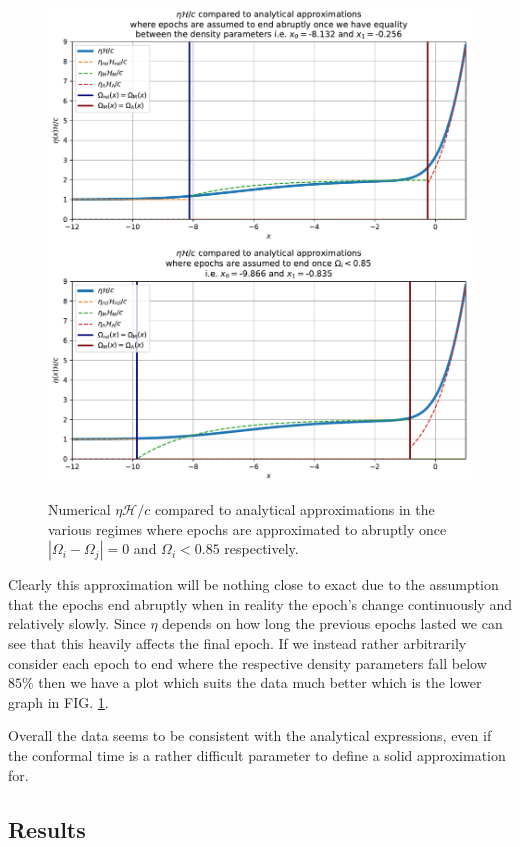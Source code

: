 \documentclass[%
reprint,
 amsmath,amssymb,
 aps,
]{revtex4-2}
\newcommand{\Hp}{\mathcal{H}}
\begin{document}
\begin{figure}
	\caption{Numerical $\eta\Hp/c$ compared to analytical approximations in the various regimes where epochs are approximated to abruptly once $|\Omega_i-\Omega_j|=0$ and $\Omega_i<0.85$ respectively.}
	\includegraphics[width = \linewidth]{Figures/Eta_vs_anal_merge.pdf}
	\label{eta_vs_anal_merge}
\end{figure}
Clearly this approximation will be nothing close to exact due to the assumption that the epochs end abruptly when in reality the epoch's change continuously and relatively slowly. Since $\eta$ depends on how long the previous epochs lasted we can see that this heavily affects the final epoch. If we instead rather arbitrarily consider each epoch to end where the respective density parameters fall below $85\%$ then we have a plot which suits the data much better which is the lower graph in FIG. \ref{eta_vs_anal_merge}.

Overall the data seems to be consistent with the analytical expressions, even if the conformal time is a rather difficult parameter to define a solid approximation for.

\subsection{Results}
\end{document}
